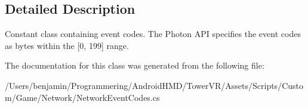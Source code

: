 \subsection{Detailed Description}
Constant class containing event codes. The Photon A\+PI specifies the event codes as bytes within the \mbox{[}0, 199\mbox{]} range. 

The documentation for this class was generated from the following file\+:\begin{DoxyCompactItemize}
\item 
/\+Users/benjamin/\+Programmering/\+Android\+H\+M\+D/\+Tower\+V\+R/\+Assets/\+Scripts/\+Custom/\+Game/\+Network/Network\+Event\+Codes.\+cs\end{DoxyCompactItemize}
